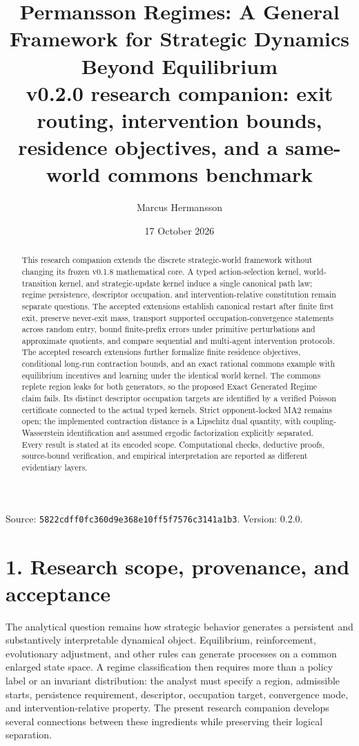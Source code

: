 \documentclass[11pt,a4paper]{article}
\title{Permansson Regimes: A General Framework for Strategic Dynamics Beyond Equilibrium\\[5pt]\large v0.2.0 research companion: exit routing, intervention bounds, residence objectives, and a same-world commons benchmark}
\author{Marcus Hermansson}
\date{17 October 2026}
\begin{document}
\maketitle
\begin{abstract}This research companion extends the discrete strategic-world framework without changing its frozen v0.1.8 mathematical core. A typed action-selection kernel, world-transition kernel, and strategic-update kernel induce a single canonical path law; regime persistence, descriptor occupation, and intervention-relative constitution remain separate questions. The accepted extensions establish canonical restart after finite first exit, preserve never-exit mass, transport supported occupation-convergence statements across random entry, bound finite-prefix errors under primitive perturbations and approximate quotients, and compare sequential and multi-agent intervention protocols. The accepted research extensions further formalize finite residence objectives, conditional long-run contraction bounds, and an exact rational commons example with equilibrium incentives and learning under the identical world kernel. The commons replete region leaks for both generators, so the proposed Exact Generated Regime claim fails. Its distinct descriptor occupation targets are identified by a verified Poisson certificate connected to the actual typed kernels. Strict opponent-locked MA2 remains open; the implemented contraction distance is a Lipschitz dual quantity, with coupling-Wasserstein identification and assumed ergodic factorization explicitly separated. Every result is stated at its encoded scope. Computational checks, deductive proofs, source-bound verification, and empirical interpretation are reported as different evidentiary layers.\end{abstract}
{\footnotesize Source: \texttt{5822cdff0fc3\allowbreak{}60d9e368e10f\allowbreak{}f5f7576c3141\allowbreak{}a1b3}. Version: 0.2.0.}
\section{1. Research scope, provenance, and acceptance}
The analytical question remains how strategic behavior generates a persistent and substantively interpretable dynamical object. Equilibrium, reinforcement, evolutionary adjustment, and other rules can generate processes on a common enlarged state space. A regime classification then requires more than a policy label or an invariant distribution: the analyst must specify a region, admissible starts, persistence requirement, descriptor, occupation target, convergence mode, and intervention-relative property. The present research companion develops several connections between these ingredients while preserving their logical separation.
\end{document}
